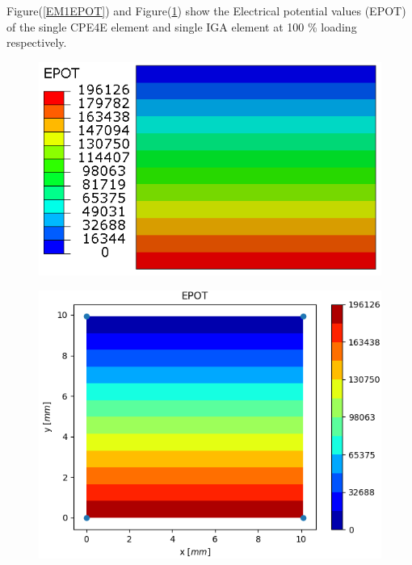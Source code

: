 \documentclass[11pt]{article}
\begin{document}
Figure(\ref{EM1EPOT}) and Figure(\ref{EM1EPOT_IGA}) show the Electrical potential values (EPOT) of the single CPE4E element and single IGA element at 100 \% loading respectively. \\
\begin{figure}[H]
	\centering
	\begin{minipage}{.5\textwidth}
		\centering
		\includegraphics[width=1\linewidth]{EM1EPOT.png}
		\label{EM1EPOT}
	\end{minipage}%
	\begin{minipage}{.5\textwidth}
		\centering
		\includegraphics[width=1\linewidth]{EM1EPOT_IGA.png}
		\label{EM1EPOT_IGA}
	\end{minipage}
\end{figure}
\end{document}
